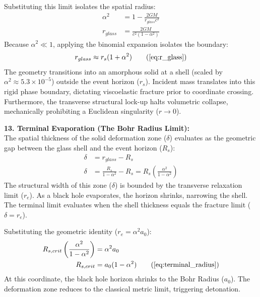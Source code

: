 Substituting this limit isolates the spatial radius:
\begin{align}
    \alpha^2 &= 1 - \frac{2GM}{r_{glass} c^2} \\ 
    r_{glass} &= \frac{2GM}{c^2(1 - \alpha^2)}
\end{align}
Because $\alpha^2 \ll 1$, applying the binomial expansion isolates the boundary:
\begin{equation}
    r_{glass} \approx r_s (1 + \alpha^2) \tag{\ref{eq:r_glass}}
\end{equation}
The geometry transitions into an amorphous solid at a shell (scaled by $\alpha^2 \approx 5.3 \times 10^{-5}$) outside the event horizon ($r_s$). 
Incident mass translates into this rigid phase boundary, dictating viscoelastic fracture prior to coordinate crossing. Furthermore, the transverse structural lock-up halts volumetric collapse, mechanically prohibiting a Euclidean singularity ($r \to 0$).

\vspace{0.2 cm}

\textbf{13. Terminal Evaporation (The Bohr Radius Limit):} \\
The spatial thickness of the solid deformation zone ($\delta$) evaluates as the geometric gap between the glass shell and the event horizon ($R_s$):
\begin{align}
    \delta &= r_{glass} - R_s \\
    \delta &= \frac{R_s}{1 - \alpha^2} - R_s = R_s \left( \frac{\alpha^2}{1 - \alpha^2} \right)
\end{align}
The structural width of this zone ($\delta$) is bounded by the transverse relaxation limit ($r_e$). As a black hole evaporates, the horizon shrinks, narrowing the shell. The terminal limit evaluates when the shell thickness equals the fracture limit ($\delta = r_e$). 

Substituting the geometric identity ($r_e = \alpha^2 a_0$):
\begin{align}
    R_{s,crit} \left( \frac{\alpha^2}{1 - \alpha^2} \right) &= \alpha^2 a_0 \\
    R_{s,crit} &= a_0(1 - \alpha^2) \tag{\ref{eq:terminal_radius}}
\end{align}
At this coordinate, the black hole horizon shrinks to the Bohr Radius ($a_0$). The deformation zone reduces to the classical metric limit, triggering detonation.

